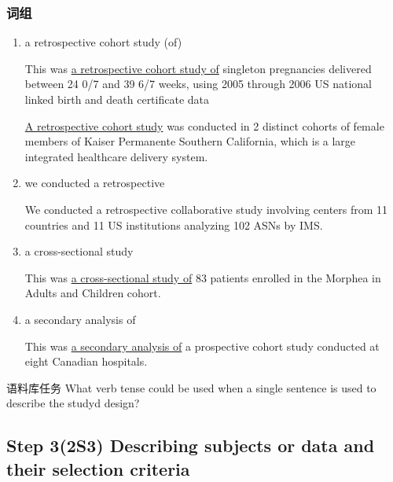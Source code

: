 \documentclass[a4paper]{ctexbook}
\begin{document}
    \subsubsection{词组}

    \begin{enumerate}
      \item a retrospective cohort study (of)
      \begin{eg}{}
        This was \uline{a retrospective cohort study of} singleton pregnancies delivered between 24 0/7 and 39 6/7 weeks, using 2005 through 2006 US national linked birth and death certificate data
      \end{eg}
      
      \begin{eg}{}
        \uline{A retrospective cohort study} was conducted in 2 distinct cohorts of female members of Kaiser Permanente Southern California, which is a large integrated healthcare delivery system.
      \end{eg}

      \item we conducted a retrospective
      \begin{eg}{}
        We conducted a retrospective collaborative study involving centers from 11 countries and 11 US institutions analyzing 102 ASNs by IMS.
      \end{eg}

      \item a cross-sectional study
      \begin{eg}{}
        This was \uline{a cross-sectional study of} 83 patients enrolled in the Morphea in Adults and Children cohort.
      \end{eg}

      \item a secondary analysis of
      \begin{eg}{}
        This was \uline{a secondary analysis of} a prospective cohort study conducted at eight Canadian hospitals.
      \end{eg}
    \end{enumerate}

    \begin{task}{\heiti 语料库任务}
      What verb tense could be used when a single sentence is used to describe the studyd design?
    \end{task}

  \subsection{Step 3(2S3) Describing subjects or data and their selection criteria}
\end{document}
